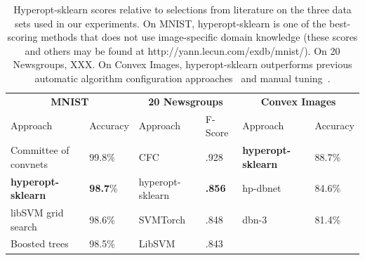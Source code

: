 \documentclass[wcp]{jmlr}
\begin{document}
\begin{table}
    \caption{
        Hyperopt-sklearn scores relative to selections from literature on the three data sets used in our experiments.
        On MNIST, hyperopt-sklearn is one of the best-scoring methods that does not use image-specific domain knowledge (these scores and others may be found at http://yann.lecun.com/exdb/mnist/).
        On 20 Newsgroups, XXX.
        On Convex Images, hyperopt-sklearn outperforms previous automatic algorithm configuration approaches~\citep{eggensperger+etal:2013} and manual tuning~\citep{larochelle+etal:2007}.
    }
    \label{tbl:acc}
    \centering
    \small
    \begin{tabular}{llllll}
        \hline
        \multicolumn{2}{c}{\textbf{MNIST}} & \multicolumn{2}{c}{\textbf{20 Newsgroups}} & \multicolumn{2}{c}{\textbf{Convex Images}}  \\
        Approach & Accuracy  & Approach & F-Score & Approach & Accuracy\\
        \hline
        Committee of convnets & 99.8\%                & CFC & .928 & \textbf{hyperopt-sklearn} & 88.7\%\\
	\textbf{hyperopt-sklearn} & \textbf{98.7}\%   & hyperopt-sklearn & \textbf{.856} & hp-dbnet & 84.6\% \\
        libSVM grid search & 98.6\%                   & SVMTorch & .848 & dbn-3 & 81.4\%\\
        Boosted trees & 98.5\%                        & LibSVM & .843 &  &  \\
    \end{tabular}
\end{table}

\end{document}
